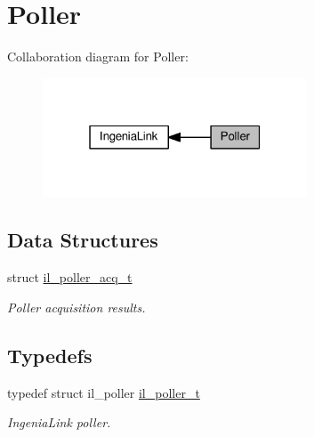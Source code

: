 \hypertarget{group__IL__POLLER}{}\section{Poller}
\label{group__IL__POLLER}
Collaboration diagram for Poller\+:\nopagebreak
\begin{figure}[H]
\begin{center}
\leavevmode
\includegraphics[width=223pt]{group__IL__POLLER}
\end{center}
\end{figure}
\subsection*{Data Structures}
\begin{DoxyCompactItemize}
\item 
struct \hyperlink{structil__poller__acq__t}{il\+\_\+poller\+\_\+acq\+\_\+t}
\begin{DoxyCompactList}\small\item\em Poller acquisition results. \end{DoxyCompactList}\end{DoxyCompactItemize}
\subsection*{Typedefs}
\begin{DoxyCompactItemize}
\item 
typedef struct il\+\_\+poller \hyperlink{group__IL__POLLER_ga896ad3836b2a1e121ce8b0c30c58d3ab}{il\+\_\+poller\+\_\+t}
\begin{DoxyCompactList}\small\item\em Ingenia\+Link poller. \end{DoxyCompactList}\end{DoxyCompactItemize}
